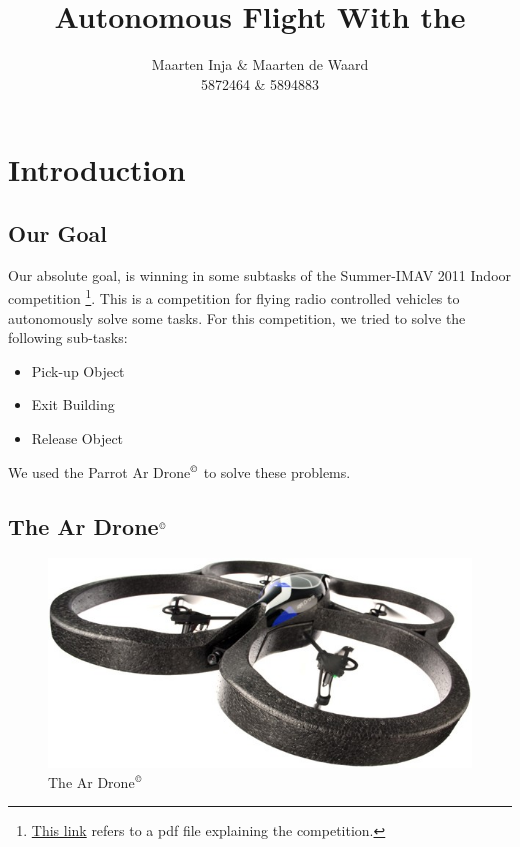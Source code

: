 \documentclass[a4paper,10pt]{article}
\title{Autonomous Flight With the \Ardrone}
\author{Maarten Inja \& Maarten de Waard\\\small 5872464 \& 5894883}
\newcommand{\Ardrone}{Ar Drone$^{\copyright}$ }
\begin{document}
\maketitle
\tableofcontents

\section{Introduction}

\subsection{Our Goal}
Our absolute goal, is winning in some subtasks of the Summer-IMAV 2011 Indoor competition \footnote{\href{http://www.imav2011.org/images/stories/documents/summerimav2011\%20indoor\%20challenges\%20v2.0.pdf}{This link} refers to a pdf file explaining the competition.}.
This is a competition for flying radio controlled vehicles to autonomously solve some tasks. For this competition, we tried to solve the following sub-tasks:
\begin{itemize}
    \item Pick-up Object
    \item Exit Building
    \item Release Object
\end{itemize}
We used the Parrot \Ardrone to solve these problems.

\subsection{The \Ardrone}
\begin{figure}
  \centering
      \includegraphics[scale=0.5]{arDrone.jpg}
  \caption{The \Ardrone}
\end{figure}
\end{document}

